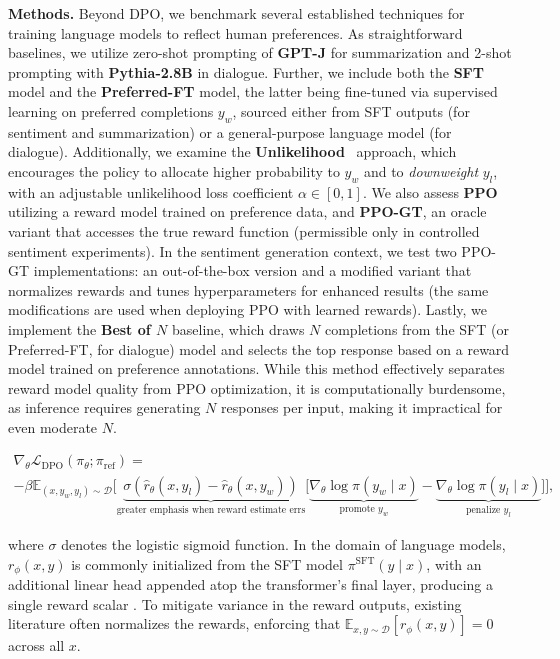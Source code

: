 \textbf{Methods.} Beyond DPO, we benchmark several established techniques for training language models to reflect human preferences. As straightforward baselines, we utilize zero-shot prompting of \textbf{GPT-J} \citep{gpt-j} for summarization and 2-shot prompting with \textbf{Pythia-2.8B} \citep{biderman2023pythia} in dialogue. Further, we include both the \textbf{SFT} model and the \textbf{Preferred-FT} model, the latter being fine-tuned via supervised learning on preferred completions $y_w$, sourced either from SFT outputs (for sentiment and summarization) or a general-purpose language model (for dialogue). Additionally, we examine the \textbf{Unlikelihood}~\citep{welleck2019neural} approach, which encourages the policy to allocate higher probability to $y_w$ and to \textit{downweight} $y_l$, with an adjustable unlikelihood loss coefficient $\alpha\in[0,1]$. We also assess \textbf{PPO} \citep{schulman2017proximal} utilizing a reward model trained on preference data, and \textbf{PPO-GT}, an oracle variant that accesses the true reward function (permissible only in controlled sentiment experiments). In the sentiment generation context, we test two PPO-GT implementations: an out-of-the-box version \cite{leandro_von_werra_2023_7790115} and a modified variant that normalizes rewards and tunes hyperparameters for enhanced results (the same modifications are used when deploying PPO with learned rewards). Lastly, we implement the \textbf{Best of $N$} baseline, which draws $N$ completions from the SFT (or Preferred-FT, for dialogue) model and selects the top response based on a reward model trained on preference annotations. While this method effectively separates reward model quality from PPO optimization, it is computationally burdensome, as inference requires generating $N$ responses per input, making it impractical for even moderate $N$.

\begin{multline*}\label{eq:gradient}
    \nabla_\theta \mathcal{L}_\text{DPO}(\pi_\theta;\pi_\text{ref}) = \\ -\beta\mathbb{E}_{(x, y_w, y_l) \sim \mathcal{D}} \bigg[\underbrace{\sigma(\hat{r}_\theta(x, y_l) - \hat{r}_\theta (x, y_w))}_\text{greater emphasis when reward estimate errs}\bigg[\underbrace{\nabla_\theta\log \pi(y_w \mid x)}_\text{promote $y_w$} - \underbrace{\nabla_\theta\log\pi(y_l \mid x)}_\text{penalize $y_l$}\bigg]\bigg],
\end{multline*}

where $\sigma$ denotes the logistic sigmoid function. In the domain of language models, $r_{\phi}(x, y)$ is commonly initialized from the SFT model $\pi^\text{SFT}(y \mid x)$, with an additional linear head appended atop the transformer's final layer, producing a single reward scalar \cite{ziegler2020finetuning}. To mitigate variance in the reward outputs, existing literature often normalizes the rewards, enforcing that $\mathbb{E}_{x,y\sim \mathcal{D}}\left[r_\phi(x, y)\right] = 0$ across all $x$.

